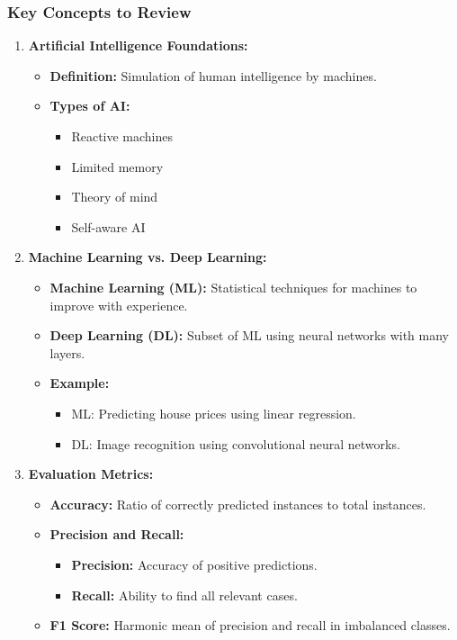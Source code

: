 \documentclass[aspectratio=169]{beamer}
\begin{document}
\begin{frame}[fragile]
    \frametitle{Key Concepts to Review}
    \begin{enumerate}
        \item \textbf{Artificial Intelligence Foundations:}
            \begin{itemize}
                \item \textbf{Definition:} Simulation of human intelligence by machines.
                \item \textbf{Types of AI:} 
                    \begin{itemize}
                        \item Reactive machines
                        \item Limited memory
                        \item Theory of mind
                        \item Self-aware AI
                    \end{itemize}
            \end{itemize}
        
        \item \textbf{Machine Learning vs. Deep Learning:}
            \begin{itemize}
                \item \textbf{Machine Learning (ML):} Statistical techniques for machines to improve with experience.
                \item \textbf{Deep Learning (DL):} Subset of ML using neural networks with many layers.
                \item \textbf{Example:} 
                    \begin{itemize}
                        \item ML: Predicting house prices using linear regression.
                        \item DL: Image recognition using convolutional neural networks.
                    \end{itemize}
            \end{itemize}
        
        \item \textbf{Evaluation Metrics:}
            \begin{itemize}
                \item \textbf{Accuracy:} Ratio of correctly predicted instances to total instances.
                \item \textbf{Precision and Recall:} 
                    \begin{itemize}
                        \item \textbf{Precision:} Accuracy of positive predictions.
                        \item \textbf{Recall:} Ability to find all relevant cases.
                    \end{itemize}
                \item \textbf{F1 Score:} Harmonic mean of precision and recall in imbalanced classes.
            \end{itemize}
    \end{enumerate}
\end{frame}
\end{document}

